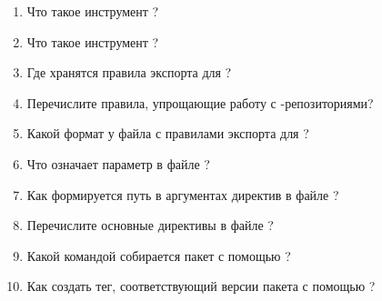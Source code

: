 \begin{enumerate}
	\item Что такое инструмент ?
	\item Что такое инструмент ?
	\item Где хранятся правила экспорта для ?
	\item Перечислите правила, упрощающие работу с -репозиториями?
	\item Какой формат у файла с правилами экспорта для ?
	\item Что означает параметр  в файле ?
	\item Как формируется путь в аргументах директив в файле ?
	\item Перечислите основные директивы в файле ?
	\item Какой командой собирается пакет с помощью ?
	\item Как создать тег, соответствующий версии пакета с помощью ?
\end{enumerate}
